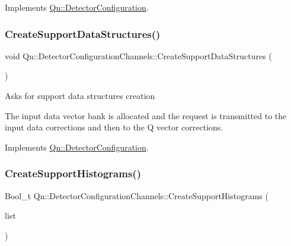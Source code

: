 Implements \mbox{\hyperlink{classQn_1_1DetectorConfiguration_a9f527d4c584e6bd79b6b8eb0b7f5413a}{Qn\+::\+Detector\+Configuration}}.

\mbox{\label{classQn_1_1DetectorConfigurationChannels_ab19e6fe4c194060859eef7941b1c716c}} 
\subsubsection{\texorpdfstring{Create\+Support\+Data\+Structures()}{CreateSupportDataStructures()}}
{\footnotesize\ttfamily void Qn\+::\+Detector\+Configuration\+Channels\+::\+Create\+Support\+Data\+Structures (\begin{DoxyParamCaption}{ }\end{DoxyParamCaption})\hspace{0.3cm}{\ttfamily [virtual]}}

Asks for support data structures creation

The input data vector bank is allocated and the request is transmitted to the input data corrections and then to the Q vector corrections. 

Implements \mbox{\hyperlink{classQn_1_1DetectorConfiguration_a664f65925f22f8f02c1a216f77b533ce}{Qn\+::\+Detector\+Configuration}}.

\mbox{\label{classQn_1_1DetectorConfigurationChannels_a68e68df13b56e3e9f55adc8cae0a505d}} 
\subsubsection{\texorpdfstring{Create\+Support\+Histograms()}{CreateSupportHistograms()}}
{\footnotesize\ttfamily Bool\+\_\+t Qn\+::\+Detector\+Configuration\+Channels\+::\+Create\+Support\+Histograms (\begin{DoxyParamCaption}\item[{T\+List $\ast$}]{list }\end{DoxyParamCaption})\hspace{0.3cm}{\ttfamily [virtual]}}


